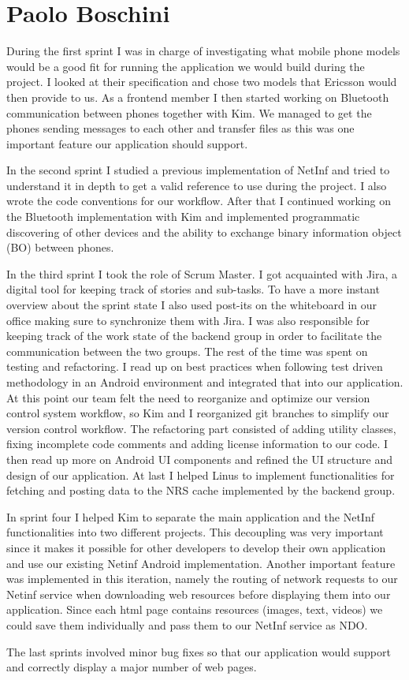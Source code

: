 \section{Paolo Boschini}
During the first sprint I was in charge of investigating what mobile phone models
would be a good fit for running the application we would build during the project.
I looked at their specification and chose two models that Ericsson would then provide to us.
As a frontend member I then started working on Bluetooth communication between phones
together with Kim. We managed to get the phones sending messages to each other and transfer
files as this was one important feature our application should support.

In the second sprint I studied a previous implementation of NetInf and tried to understand
it in depth to get a valid reference to use during the project. 
I also wrote the code conventions for our workflow. After that I continued working on the Bluetooth implementation
with Kim and implemented programmatic discovering of other devices and the ability to
exchange binary information object (BO) between phones.

In the third sprint I took the role of Scrum Master. I got acquainted with Jira, a digital tool for keeping track of stories and sub-tasks.
To have a more instant overview about the sprint state I also used post-its on the whiteboard in our office making sure to synchronize them with Jira.
I was also responsible for keeping track of the work state of the backend group in order to facilitate the communication between
the two groups. The rest of the time was spent on testing and refactoring. I read up on best practices when following 
test driven methodology in an Android environment and integrated that into our application.
At this point our team felt the need to reorganize and optimize our version control system workflow,
so Kim and I reorganized git branches to simplify our version control workflow.
The refactoring part consisted of adding utility classes, fixing incomplete code comments and adding license
information to our code. I then read up more on Android UI components and refined the UI structure and design of our application.
At last I helped Linus to implement functionalities for fetching and posting data to the NRS cache implemented by the backend group.

In sprint four I helped Kim to separate the main application and the NetInf functionalities into two different projects.
This decoupling was very important since it makes it possible for other developers to develop their own application
and use our existing Netinf Android implementation.
Another important feature was implemented in this iteration, namely the routing of network requests to our Netinf service
when downloading web resources before displaying them into our application. Since each html page contains resources (images, text, videos) we could
save them individually and pass them to our NetInf service as NDO.

The last sprints involved minor bug fixes so that our application would support and correctly display a major number of web pages.
